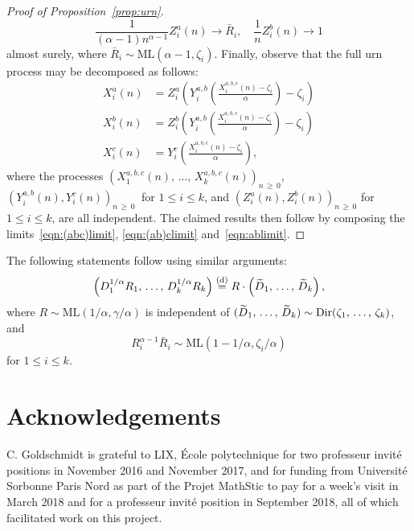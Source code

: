 \documentclass[AHL,Unicode,longabstracts,published]{cedram}
\newcommand{\equidist}{\ensuremath{\stackrel{\mathrm{(d)}}{=}}}
\newcommand{\ML}{\mathrm{ML}}
\newcommand{\Dir}{\mathrm{Dir}}
\let\oldtilde\tilde
\renewcommand*{\tilde}[1]{\mathchoice{\widetilde{#1}}{\widetilde{#1}}{\oldtilde{#1}}{\oldtilde{#1}}}
\begin{document}
\begin{proof}[Proof of Proposition~\ref{prop:urn}]
\begin{equation}\label{eqn:ablimit}
\frac{1}{(\alpha-1) n^{\alpha-1}}Z^a_i(n) \to \bar{R}_i, \quad \frac{1}{n} Z^b_i(n) \to 1
\end{equation}
almost surely, where $\bar{R}_i\sim \ML(\alpha-1, \zeta_i)$. Finally, observe that the full urn process may be decomposed as follows:
\begin{align*}
X_i^a(n) & = Z_i^a\left(Y_i^{a,b}\left(\frac{X^{a,b,c}_i(n) -\zeta_i}{\alpha}\right) - \zeta_i\right) \\
X_i^b(n) & = Z_i^b\left(Y_i^{a,b}\left(\frac{X^{a,b,c}_i(n) -\zeta_i}{\alpha}\right) - \zeta_i\right) \\
X_i^c(n) & = Y_i^{c}\left(\frac{X^{a,b,c}_i(n) -\zeta_i}{\alpha}\right),
\end{align*}
where the processes $(X_1^{a,b,c}(n),\,\ldots,\, X_k^{a,b,c}(n))_{n\,\ge\,0}$, $(Y_i^{a,b}(n), Y_i^{c}(n))_{n\,\ge\,0}\ $ for $1 \le i \le k$, and $(Z_i^a(n), Z_i^b(n))_{n\,\ge\,0}$ for $1 \le i \le k$, are all independent. The claimed results then follow by composing the limits~\eqref{eqn:(abc)limit}, \eqref{eqn:(ab)climit} and~\eqref{eqn:ablimit}.
\end{proof}

\begin{rema}\label{rem:identityMLDir}
The following statements follow using similar arguments:
\[
\left(D_1^{1/\alpha} R_1,\,\ldots,\, D_k^{1/\alpha} R_k\right) \equidist R \cdot \left(\tilde{D}_1, \,\ldots,\,\tilde{D}_k\right),
\]
where $R \sim \ML(1/\alpha, \gamma/\alpha)$ is independent of $(\tilde{D}_1,\,\ldots,\,\tilde{D}_k) \sim \Dir(\zeta_1,\,\ldots,\,\zeta_k)$, and
\[
R_i^{\alpha-1} \bar{R}_i \sim \ML\left(1-1/\alpha,\zeta_i/\alpha\right)
\]
for $1 \le i \le k$.
\end{rema}


\section*{Acknowledgements}

C. Goldschmidt is grateful to LIX, {\'E}cole polytechnique for two professeur invité positions in November 2016 and November 2017, and for funding from Université Sorbonne Paris Nord as part of the Projet MathStic to pay for a week's visit in March 2018 and for a professeur invité position in September 2018, all of which facilitated work on this project.




\end{document}
